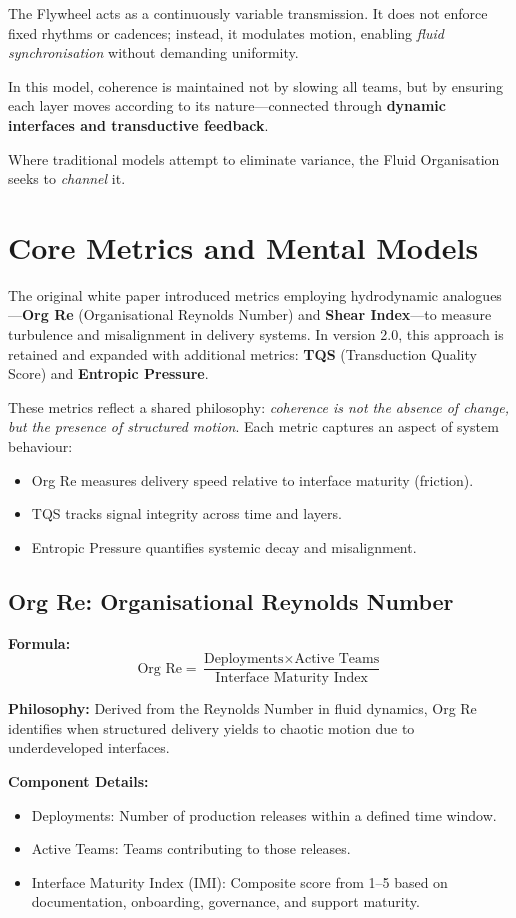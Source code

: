 \documentclass[12pt]{article}
\begin{document}
The Flywheel acts as a continuously variable transmission. It does not enforce fixed rhythms or cadences; instead, it modulates motion, enabling \textit{fluid synchronisation} without demanding uniformity.

In this model, coherence is maintained not by slowing all teams, but by ensuring each layer moves according to its nature—connected through \textbf{dynamic interfaces and transductive feedback}.

Where traditional models attempt to eliminate variance, the Fluid Organisation seeks to \textit{channel} it.


\section{Core Metrics and Mental Models}

The original white paper introduced metrics employing hydrodynamic analogues—\textbf{Org Re} (Organisational Reynolds Number) and \textbf{Shear Index}—to measure turbulence and misalignment in delivery systems. In version 2.0, this approach is retained and expanded with additional metrics: \textbf{TQS} (Transduction Quality Score) and \textbf{Entropic Pressure}.

These metrics reflect a shared philosophy: \textit{coherence is not the absence of change, but the presence of structured motion}. Each metric captures an aspect of system behaviour:
\begin{itemize}
    \item Org Re measures delivery speed relative to interface maturity (friction).
    \item TQS tracks signal integrity across time and layers.
    \item Entropic Pressure quantifies systemic decay and misalignment.
\end{itemize}

\subsection{Org Re: Organisational Reynolds Number}

\textbf{Formula:}
\[
\text{Org Re} = \frac{\text{Deployments} \times \text{Active Teams}}{\text{Interface Maturity Index}}
\]

\textbf{Philosophy:} Derived from the Reynolds Number in fluid dynamics, Org Re identifies when structured delivery yields to chaotic motion due to underdeveloped interfaces.

\textbf{Component Details:}
\begin{itemize}
    \item Deployments: Number of production releases within a defined time window.
    \item Active Teams: Teams contributing to those releases.
    \item Interface Maturity Index (IMI): Composite score from 1–5 based on documentation, onboarding, governance, and support maturity.
\end{itemize}
\end{document}
